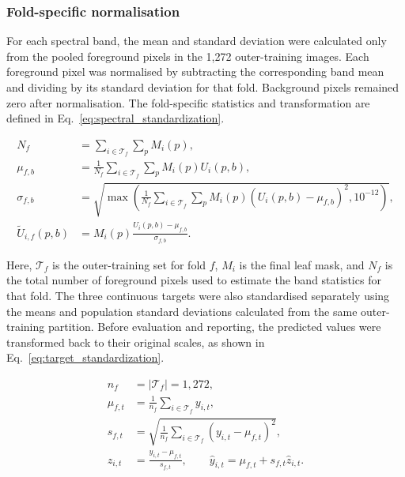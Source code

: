 \documentclass[11pt]{article}
\begin{document}
\subsubsection{Fold-specific normalisation}
For each spectral band, the mean and standard deviation were calculated only
from the pooled foreground pixels in the 1,272 outer-training images. Each
foreground pixel was normalised by subtracting the corresponding band mean and
dividing by its standard deviation for that fold. Background pixels remained
zero after normalisation. The fold-specific statistics and transformation are
defined in Eq.~\eqref{eq:spectral_standardization}.

\begin{equation}
\begin{aligned}
N_f
&=
\sum_{i\in\mathcal{T}_f}\sum_p M_i(p),
\\[4pt]
\mu_{f,b}
&=
\frac{1}{N_f}
\sum_{i\in\mathcal{T}_f}\sum_p
M_i(p)U_i(p,b),
\\[4pt]
\sigma_{f,b}
&=
\sqrt{
\max\left(
\frac{1}{N_f}
\sum_{i\in\mathcal{T}_f}\sum_p
M_i(p)
\left(U_i(p,b)-\mu_{f,b}\right)^2,
10^{-12}
\right)
},
\\[4pt]
\widetilde{U}_{i,f}(p,b)
&=
M_i(p)
\frac{U_i(p,b)-\mu_{f,b}}
{\sigma_{f,b}} .
\end{aligned}
\label{eq:spectral_standardization}
\end{equation}

Here, $\mathcal{T}_f$ is the outer-training set for fold $f$, $M_i$ is the
final leaf mask, and $N_f$ is the total number of foreground pixels used to
estimate the band statistics for that fold. The three continuous targets were
also standardised separately using the means and population standard deviations
calculated from the same outer-training partition. Before evaluation and
reporting, the predicted values were transformed back to their original
scales, as shown in Eq.~\eqref{eq:target_standardization}.

\begin{equation}
\begin{aligned}
n_f
&=
|\mathcal{T}_f|
=
1{,}272,
\\[4pt]
\mu_{f,t}
&=
\frac{1}{n_f}
\sum_{i\in\mathcal{T}_f}
y_{i,t},
\\[4pt]
s_{f,t}
&=
\sqrt{
\frac{1}{n_f}
\sum_{i\in\mathcal{T}_f}
\left(y_{i,t}-\mu_{f,t}\right)^2
},
\\[4pt]
z_{i,t}
&=
\frac{y_{i,t}-\mu_{f,t}}
{s_{f,t}},
\qquad
\widehat{y}_{i,t}
=
\mu_{f,t}
+
s_{f,t}\widehat{z}_{i,t}.
\end{aligned}
\label{eq:target_standardization}
\end{equation}
\end{document}
